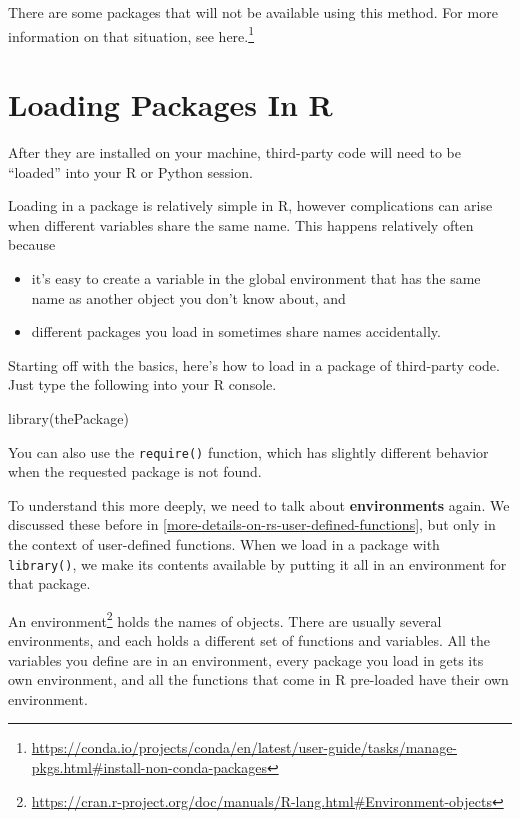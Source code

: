 \documentclass[
  12pt,
  krantz2]{krantz}
\makeatletter
\newenvironment{Shaded}{\begin{snugshade}}{\end{snugshade}}
\newcommand{\FunctionTok}[1]{\textcolor[rgb]{0,0,0}{#1}}
\newcommand{\NormalTok}[1]{#1}
\providecommand{\tightlist}{%
  \setlength{\itemsep}{0pt}\setlength{\parskip}{0pt}}
\renewcommand{\href}[2]{#2\footnote{\url{#1}}}
\newenvironment{kframe}{%
\medskip{}
\setlength{\fboxsep}{.8em}
 \def\at@end@of@kframe{}%
 \ifinner\ifhmode%
  \def\at@end@of@kframe{\end{minipage}}%
  \begin{minipage}{\columnwidth}%
 \fi\fi%
 \def\FrameCommand##1{\hskip\@totalleftmargin \hskip-\fboxsep
 \colorbox{shadecolor}{##1}\hskip-\fboxsep
     \hskip-\linewidth \hskip-\@totalleftmargin \hskip\columnwidth}%
 \MakeFramed {\advance\hsize-\width
   \@totalleftmargin\z@ \linewidth\hsize
   \@setminipage}}%
 {\par\unskip\endMakeFramed%
 \at@end@of@kframe}
\renewenvironment{Shaded}{\begin{kframe}}{\end{kframe}}
\makeatother
\begin{document}
There are some packages that will not be available using this method. For more information on that situation, see \href{https://conda.io/projects/conda/en/latest/user-guide/tasks/manage-pkgs.html\#install-non-conda-packages}{here.}

\hypertarget{loading-packages-in-r}{%
\section{Loading Packages In R}\label{loading-packages-in-r}}

After they are installed on your machine, third-party code will need to be ``loaded'' into your R or Python session.

Loading in a package is relatively simple in R, however complications can arise when different variables share the same name. This happens relatively often because

\begin{itemize}
\tightlist
\item
  it's easy to create a variable in the global environment that has the same name as another object you don't know about, and
\item
  different packages you load in sometimes share names accidentally.
\end{itemize}

Starting off with the basics, here's how to load in a package of third-party code. Just type the following into your R console.

\begin{Shaded}
\begin{Highlighting}[]
\FunctionTok{library}\NormalTok{(thePackage)}
\end{Highlighting}
\end{Shaded}

You can also use the \texttt{require()} function, which has slightly different behavior when the requested package is not found.

To understand this more deeply, we need to talk about \textbf{environments} again. We discussed these before in \ref{more-details-on-rs-user-defined-functions}, but only in the context of user-defined functions. When we load in a package with \texttt{library()}, we make its contents available by putting it all in an environment for that package.

An \href{https://cran.r-project.org/doc/manuals/R-lang.html\#Environment-objects}{environment} holds the names of objects. There are usually several environments, and each holds a different set of functions and variables. All the variables you define are in an environment, every package you load in gets its own environment, and all the functions that come in R pre-loaded have their own environment.
\end{document}
